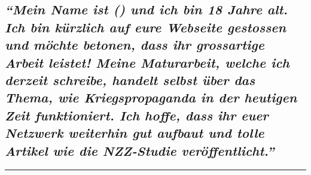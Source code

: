 \hypertarget{mein-name-ist--und-ich-bin-18-jahre-alt-ich-bin-kuxfcrzlich-auf-eure-webseite-gestossen-und-muxf6chte-betonen-dass-ihr-grossartige-arbeit-leistet-meine-maturarbeit-welche-ich-derzeit-schreibe-handelt-selbst-uxfcber-das-thema-wie-kriegspropaganda-in-der-heutigen-zeit-funktioniert-ich-hoffe-dass-ihr-euer-netzwerk-weiterhin-gut-aufbaut-und-tolle-artikel-wie-die-nzz-studie-veruxf6ffentlicht}{%
\subsection{\texorpdfstring{\emph{``Mein Name ist () und ich bin 18
Jahre alt. Ich bin kürzlich auf eure Webseite gestossen und möchte
betonen, dass ihr gross­artige Arbeit leistet! Meine Matur­arbeit,
welche ich derzeit schreibe, handelt selbst über das Thema, wie
Kriegs­propaganda in der heutigen Zeit funktioniert. Ich hoffe, dass ihr
euer Netz­werk weiterhin gut aufbaut und tolle Artikel wie die
NZZ-Studie
veröffentlicht.''}}{``Mein Name ist () und ich bin 18 Jahre alt. Ich bin kürzlich auf eure Webseite gestossen und möchte betonen, dass ihr gross­artige Arbeit leistet! Meine Matur­arbeit, welche ich derzeit schreibe, handelt selbst über das Thema, wie Kriegs­propaganda in der heutigen Zeit funktioniert. Ich hoffe, dass ihr euer Netz­werk weiterhin gut aufbaut und tolle Artikel wie die NZZ-Studie veröffentlicht.''}}\label{mein-name-ist--und-ich-bin-18-jahre-alt-ich-bin-kuxfcrzlich-auf-eure-webseite-gestossen-und-muxf6chte-betonen-dass-ihr-grossartige-arbeit-leistet-meine-maturarbeit-welche-ich-derzeit-schreibe-handelt-selbst-uxfcber-das-thema-wie-kriegspropaganda-in-der-heutigen-zeit-funktioniert-ich-hoffe-dass-ihr-euer-netzwerk-weiterhin-gut-aufbaut-und-tolle-artikel-wie-die-nzz-studie-veruxf6ffentlicht}}

\begin{center}\rule{0.5\linewidth}{\linethickness}\end{center}

